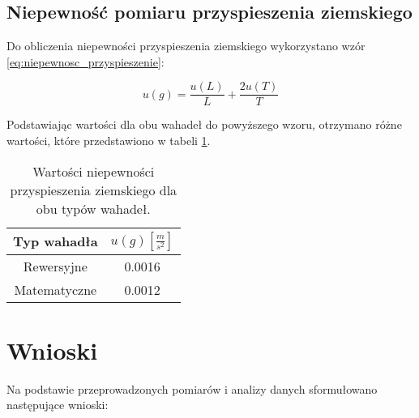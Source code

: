 \documentclass[a4paper,12pt]{article}
\begin{document}
\subsection{Niepewność pomiaru przyspieszenia ziemskiego}

Do obliczenia niepewności przyspieszenia ziemskiego wykorzystano wzór \ref{eq:niepewnosc_przyspieszenie}:

\begin{equation}
  \label{eq:niepewnosc_przyspieszenie}
  u(g) = \frac{u(L)}{L} + \frac{2 u(T)}{T}
\end{equation}

Podstawiając wartości dla obu wahadeł do powyższego wzoru, otrzymano różne wartości, które przedstawiono w tabeli \ref{tab:niepewnosci}.


\begin{table}[H]
  \centering
  \begin{tabular}{|c|c|}
    \hline
    Typ wahadła & $u(g) \left[\frac{m}{s^2}\right]$ \\
    \hline
    Rewersyjne & 0.0016 \\
    \hline
    Matematyczne & 0.0012 \\
    \hline
  \end{tabular}
  \caption{Wartości niepewności przyspieszenia ziemskiego dla obu typów wahadeł.}
  \label{tab:niepewnosci}
\end{table}

\section{Wnioski}


Na podstawie przeprowadzonych pomiarów i analizy danych sformułowano następujące wnioski:
\end{document}
